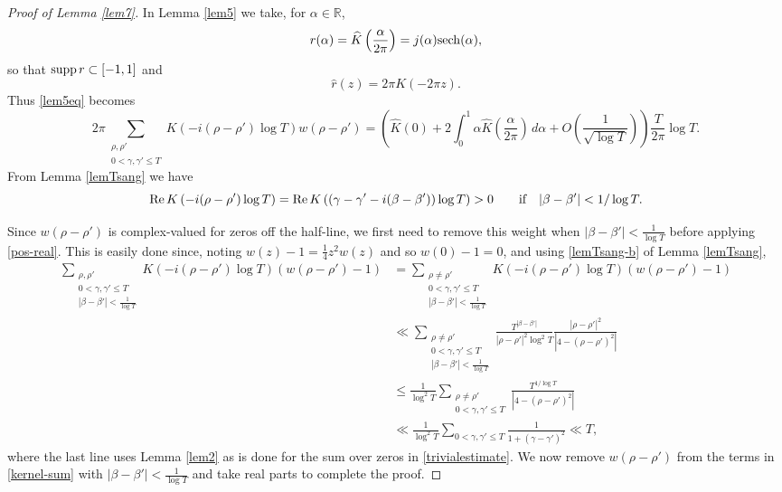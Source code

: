 \documentclass{amsart}
\newcommand{\1}{\mathbbm{1}}
\theoremstyle{remark}
\numberwithin{equation}{section}
\begin{document}
\begin{proof}[Proof of Lemma \ref{lem7}]
In Lemma \ref{lem5} we take, for $\alpha \in \mathbb{R}$,
$$ r(\alpha) = \widehat{K}\left(\frac{\alpha}{2\pi}\right) = j(\alpha){\rm sech}(\alpha), $$
so that ${\rm supp}\,r\subset[-1,1]$ and
$$ \widehat{r}(z) = 2\pi K(-2\pi z). $$
Thus \eqref{lem5eq} becomes 
\begin{equation}\label{kernel-sum}
2\pi \sum_{\substack{\rho, \rho' \\ 0<\gamma,\gamma'\le T}} 
K\left(-i(\rho -\rho')\log{T}\right) w(\rho-\rho')
= \left(\widehat{K}(0) + 2\int_0^1 \alpha\widehat{K}\left(\frac{\alpha}{2\pi}\right)\, d\alpha +O\left(\frac1{\sqrt{\log T}}\right)\right)\frac{T}{2\pi}\log T.
\end{equation} 
From Lemma \ref{lemTsang} we have
\begin{equation}\label{pos-real}
{\rm Re}\,K\left(-i(\rho -\rho')\log{T}\right)
= {\rm Re}\,K\left((\gamma-\gamma'-i(\beta-\beta'))\log T\right) > 0 \qquad \text{if} \quad |\beta-\beta'| < 1/\log T.
\end{equation}

Since $w(\rho-\rho')$ is complex-valued for zeros off the half-line, we first need to remove this weight when $|\beta-\beta'| < \frac1{\log T}$ before applying \eqref{pos-real}. This is easily done
since, noting $w(z)-1 = \frac14z^2w(z)$ and so $w(0)-1=0$, and using \ref{lemTsang-b} of Lemma \ref{lemTsang},
\begin{equation}\label{removing-weight}
\begin{aligned}
\sum_{\substack{\rho,\rho' \\ 0<\gamma,\gamma'\le T\\ |\beta-\beta'| < \frac1{\log T}}}
K\left(-i(\rho-\rho')\log{T}\right)
(w(\rho-\rho')-1) &=
\sum_{\substack{\rho\neq\rho' \\ 0<\gamma,\gamma'\le T\\ |\beta-\beta'| < \frac1{\log T}}}
K\left(-i(\rho-\rho')\log{T}\right)
(w(\rho-\rho')-1)
\\ & \ll \sum_{\substack{\rho\neq\rho' \\ 0<\gamma,\gamma'\le T\\ |\beta-\beta'| < \frac1{\log T}}} \frac{T^{|\beta-\beta'|}}{|\rho-\rho'|^2\log^2T} \frac{|\rho-\rho'|^2}{|4-(\rho-\rho')^2|} \\
&\le \frac1{\log^2T} \sum_{\substack{\rho\neq\rho' \\ 0<\gamma,\gamma'\le T}} \frac{T^{1/\log T}}{|4-(\rho-\rho')^2|} \\ &\ll \frac1{\log^2T} \sum_{0<\gamma,\gamma'\le T} \frac1{1+(\gamma-\gamma')^2} %
\ll T, 
\end{aligned}
\end{equation}
where the last line uses Lemma \ref{lem2} as is done for the sum over zeros in \eqref{trivialestimate}. We now remove $w(\rho-\rho')$ from the terms in \eqref{kernel-sum} with $|\beta-\beta'| < \frac1{\log T}$ and take real parts to complete the proof.
\end{proof}
\end{document}
